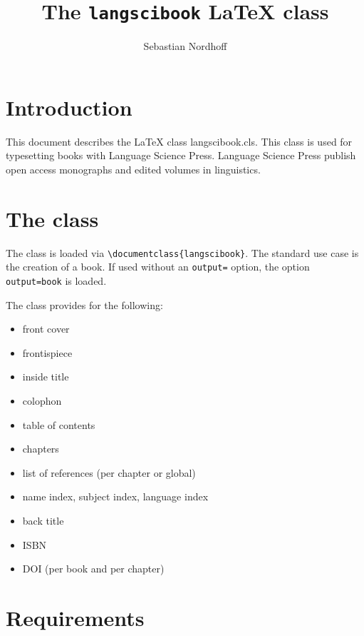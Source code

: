 \documentclass[output=guidelines]{langscibook}
\author{Sebastian Nordhoff}
\title{The \texttt{langscibook} {\LaTeX} class}
\subtitle{}
\begin{document}
\maketitle

\frontmatter
{} %
\tableofcontents
% 
% 
% 

\mainmatter
\chapter{Introduction}
This document describes the {\LaTeX} class langscibook.cls. This class is used for typesetting books with Language Science Press. Language Science Press publish open access monographs and edited volumes in linguistics.


\chapter{The class}
The class is loaded via \verb+\documentclass{langscibook}+. The standard use case is the creation of a book. If used without an \texttt{output=} option, the option \texttt{output=book} is loaded.

The class provides for the following:
\begin{itemize}
 \item front cover
 \item frontispiece
 \item inside title
 \item colophon
 \item table of contents
 \item chapters
 \item list of references (per chapter or global)
 \item name index, subject index, language index
 \item back title
 \item ISBN
 \item DOI (per book and per chapter)
\end{itemize}


\chapter{Requirements}
\end{document}
